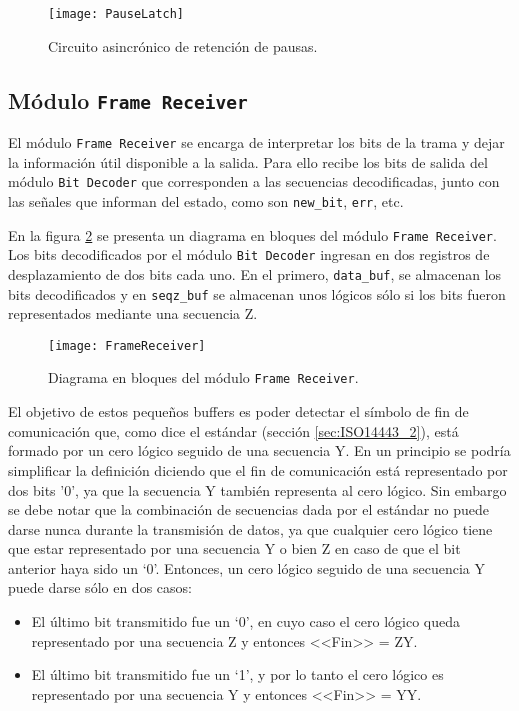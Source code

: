 \begin{figure}
	\centering
	\texttt{[image: PauseLatch]}
	\caption{Circuito asincrónico de retención de pausas.}
	\label{fig:PauseLatch}
\end{figure}


\subsection{Módulo \lstinline{Frame Receiver}}

El módulo \lstinline{Frame Receiver} se encarga de interpretar los 
bits de la trama y dejar la información útil disponible a la salida. 
Para ello recibe los bits de salida del módulo \lstinline{Bit Decoder}
que corresponden a las secuencias decodificadas, junto con las señales
que informan del estado, como son \lstinline{new_bit}, \lstinline{err},
etc.

En la figura \ref{fig:DiagramaFrameReceiver} se presenta un diagrama 
en bloques del módulo \lstinline{Frame Receiver}. Los bits 
decodificados por el módulo \lstinline{Bit Decoder} ingresan en dos 
registros de desplazamiento de dos bits cada uno. En el primero, 
\lstinline{data_buf}, se almacenan los bits decodificados y en 
\lstinline{seqz_buf} se almacenan unos lógicos sólo si los bits 
fueron representados mediante una secuencia Z.

\begin{figure}
	\centering
	\texttt{[image: FrameReceiver]}
	\caption{Diagrama en bloques del módulo \lstinline{Frame Receiver}.}
	\label{fig:DiagramaFrameReceiver}
\end{figure}

El objetivo de estos pequeños buffers es poder detectar el símbolo de 
fin de comunicación que, como dice el estándar (sección 
\ref{sec:ISO14443_2}), está formado por un cero lógico seguido de una 
secuencia Y. En un principio se podría simplificar la definición 
diciendo que el fin de comunicación está representado por dos bits 
'0', ya que la secuencia Y también representa al cero lógico. Sin 
embargo se debe notar que la combinación de secuencias dada por el 
estándar no puede darse nunca durante la transmisión de datos, ya que
cualquier cero lógico tiene que estar representado por una secuencia 
Y o bien Z en caso de que el bit anterior haya sido un `0'. 
Entonces, un cero lógico seguido de una secuencia Y puede darse sólo 
en dos casos:

\begin{itemize}
	\item El último bit transmitido fue un `0', en cuyo caso el cero 
	lógico queda representado por una secuencia Z y entonces <<Fin>> = 
	ZY.
	
	\item El último bit transmitido fue un `1', y por lo tanto el cero 
	lógico es representado por una secuencia Y y entonces <<Fin>> = 
	YY.
\end{itemize}

